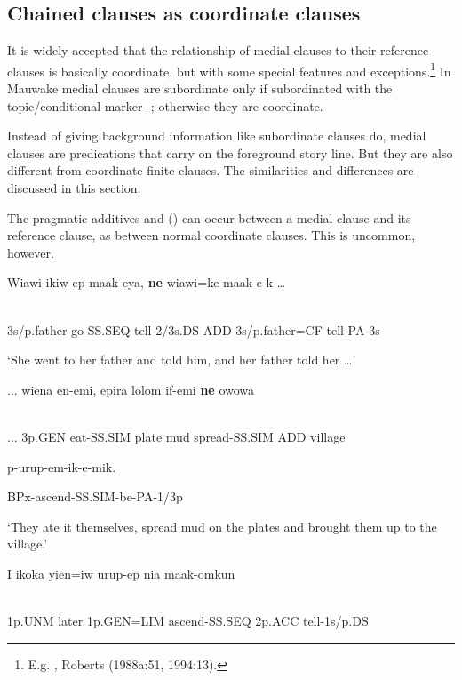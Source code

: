 \subsection{Chained clauses as coordinate clauses}
\hypertarget{RefHeading23121935131865}{}
It is widely accepted that the relationship of medial clauses to their reference clauses is basically coordinate, but with some special features and exceptions.\footnote{E.g. \citet[175,193]{Reesink1987}, Roberts (1988a:51, 1994:13).} In Mauwake medial clauses are subordinate only if subordinated with the topic/conditional marker -; otherwise they are coordinate. 

Instead of giving background information like subordinate clauses do, medial clauses are predications that carry on the foreground story line. But they are also different from coordinate finite clauses. The similarities and differences are discussed in this section.

The pragmatic additives  and  () can occur between a medial clause and its reference clause, as between normal coordinate clauses. This is uncommon, however.

\ea%
\label{ex:x1444}
\gll Wiawi  ikiw-ep  maak-eya,  \textbf{ne}  wiawi=ke  maak-e-k  {\dots} \\
      \\
\glt
\z

3s/p.father  go-SS.SEQ  tell-2/3s.DS  ADD  3s/p.father=CF  tell-PA-3s

`She went to her father and told him, and her father told her {\dots}'

\ea%
\label{ex:x1445}
\gll ...  wiena  en-emi,  epira  lolom  if-emi  \textbf{ne}  owowa \\
      \\
\glt
\z

...  3p.GEN  eat-SS.SIM  plate  mud  spread-SS.SIM  ADD  village

p-urup-em-ik-e-mik.

BPx-ascend-SS.SIM-be-PA-1/3p

`They ate it themselves, spread mud on the plates and brought them up to the village.'

\ea%
\label{ex:x1442}
\gll I  ikoka  yien=iw  urup-ep  nia  maak-omkun \\
      \\
\glt
\z

1p.UNM  later  1p.GEN=LIM  ascend-SS.SEQ  2p.ACC  tell-1s/p.DS

